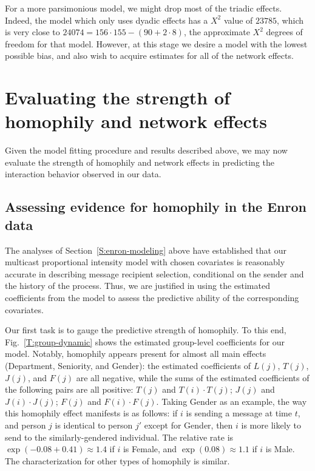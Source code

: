 \documentclass[final]{statsoc}
\begin{document}
For a more parsimonious model, we might drop most of the triadic effects.
Indeed, the model which only uses dyadic effects has a $X^2$ value of $23785$,
which is very close to $24074 = 156 \cdot 155 - (90 + 2 \cdot 8)$, the
approximate $X^2$ degrees of freedom for that model.  However, at this stage
we desire a model with the lowest possible bias, and also wish to acquire estimates for all
of the network effects.

\section{Evaluating the strength of homophily and network effects}\label{S:strength-of-effects}

Given the model fitting procedure and results described above, we may now
evaluate the strength of homophily and network effects in predicting the
interaction behavior observed in our data.

\subsection{Assessing evidence for homophily in the Enron data}\label{S:enron-homophily}

The analyses of Section~\ref{S:enron-modeling} above have established that our
multicast proportional intensity model with chosen covariates is reasonably
accurate in describing message recipient selection, conditional on the sender
and the history of the process.  Thus, we are justified in using the estimated
coefficients from the model to assess the predictive ability of the
corresponding covariates.

Our first task is to gauge the predictive strength of homophily.  To this end,
Fig.~\ref{T:group-dynamic} shows the estimated group-level coefficients for
our model.  Notably, homophily appears present for almost all main effects
(Department, Seniority, and Gender): the estimated coefficients of $L(j)$,
$T(j)$, $J(j)$, and $F(j)$ are all negative, while the sums of the estimated
coefficients of the following pairs are all positive:
$T(j)$ and $T(i) \cdot T(j)$;
$J(j)$ and $J(i) \cdot J(j)$;
$F(j)$ and $F(i) \cdot F(j)$.
Taking Gender as an example, the way this homophily
effect manifests is as follows: if $i$ is sending a message at time $t$, and
person $j$ is identical to person $j'$ except for Gender, then $i$ is more
likely to send to the similarly-gendered individual.  The relative rate
is $\exp(-0.08 + 0.41) \approx 1.4$ if $i$ is Female, and $\exp(0.08) \approx
1.1$ if $i$ is Male.  The characterization for other types of homophily is
similar.
\end{document}
